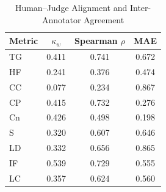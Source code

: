 \begin{table}[h]
\centering
\caption{Human–Judge Alignment and Inter-Annotator Agreement}
\label{tab:hitl_alignment}
\begin{tabular}{lccc}
\toprule
\textbf{Metric} & \textbf{$\kappa_w$} & \textbf{Spearman $\rho$} & \textbf{MAE} \\
\midrule
TG & 0.411 & 0.741 & 0.672 \\
HF & 0.241 & 0.376 & 0.474 \\
CC & 0.077 & 0.234 & 0.867 \\
CP & 0.415 & 0.732 & 0.276 \\
Cn & 0.426 & 0.498 & 0.198 \\
S & 0.320 & 0.607 & 0.646 \\
LD & 0.332 & 0.656 & 0.865 \\
IF & 0.539 & 0.729 & 0.555 \\
LC & 0.357 & 0.624 & 0.560 \\
\bottomrule
\end{tabular}
\end{table}